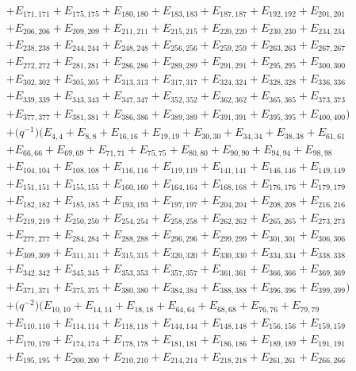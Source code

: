 \documentclass[pdftex]{sigma}
\numberwithin{equation}{section}
\theoremstyle{definition}
\begin{document}
\begin{align*}
&+E_{171,171}+E_{175,175}+E_{180,180}+E_{183,183}+E_{187,187}+E_{192,192}+E_{201,201}\\
&+E_{206,206}+E_{209,209}+E_{211,211}+E_{215,215}+E_{220,220}+E_{230,230}+E_{234,234}\\
&+E_{238,238}+E_{244,244}+E_{248,248}+E_{256,256}+E_{259,259}+E_{263,263}+E_{267,267}\\
&+E_{272,272}+E_{281,281}+E_{286,286}+E_{289,289}+E_{291,291}+E_{295,295}+E_{300,300}\\
&+E_{302,302}+E_{305,305}+E_{313,313}+E_{317,317}+E_{324,324}+E_{328,328}+E_{336,336}\\
&+E_{339,339}+E_{343,343}+E_{347,347}+E_{352,352}+E_{362,362}+E_{365,365}+E_{373,373}\\
&+E_{377,377}+E_{381,381}+E_{386,386}+E_{389,389}+E_{391,391}+E_{395,395}+E_{400,400})\\
&+\bigl(q^{-1}\bigr)(E_{4,4}+E_{8,8}+E_{16,16}+E_{19,19}+E_{30,30}+E_{34,34}+E_{38,38}+E_{61,61}\\
&+E_{66,66}+E_{69,69}+E_{71,71}+E_{75,75}+E_{80,80}+E_{90,90}+E_{94,94}+E_{98,98}\\
&+E_{104,104}+E_{108,108}+E_{116,116}+E_{119,119}+E_{141,141}+E_{146,146}+E_{149,149}\\
&+E_{151,151}+E_{155,155}+E_{160,160}+E_{164,164}+E_{168,168}+E_{176,176}+E_{179,179}\\
&+E_{182,182}+E_{185,185}+E_{193,193}+E_{197,197}+E_{204,204}+E_{208,208}+E_{216,216}\\
&+E_{219,219}+E_{250,250}+E_{254,254}+E_{258,258}+E_{262,262}+E_{265,265}+E_{273,273}\\
&+E_{277,277}+E_{284,284}+E_{288,288}+E_{296,296}+E_{299,299}+E_{301,301}+E_{306,306}\\
&+E_{309,309}+E_{311,311}+E_{315,315}+E_{320,320}+E_{330,330}+E_{334,334}+E_{338,338}\\
&+E_{342,342}+E_{345,345}+E_{353,353}+E_{357,357}+E_{361,361}+E_{366,366}+E_{369,369}\\
&+E_{371,371}+E_{375,375}+E_{380,380}+E_{384,384}+E_{388,388}
+E_{396,396}+E_{399,399})\\
&+\bigl(q^{-2}\bigr)(E_{10,10}+E_{14,14}+E_{18,18}+E_{64,64}+E_{68,68}+E_{76,76}+E_{79,79}\\
&+E_{110,110}+E_{114,114}+E_{118,118}+E_{144,144}+E_{148,148}+E_{156,156}+E_{159,159}\\
&+E_{170,170}+E_{174,174}+E_{178,178}+E_{181,181}+E_{186,186}+E_{189,189}+E_{191,191}\\
&+E_{195,195}+E_{200,200}+E_{210,210}+E_{214,214}+E_{218,218}+E_{261,261}+E_{266,266}\\

\end{align*}
\end{document}
